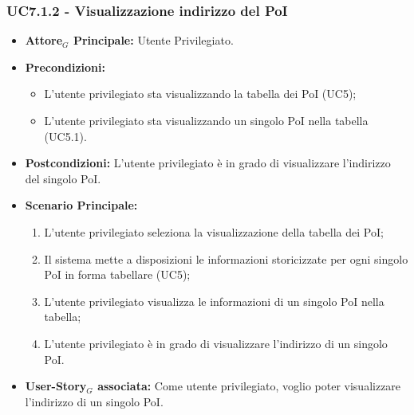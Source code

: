 \documentclass[11pt]{article}
\begin{document}
\begin{justify}
\subsubsection{\textbf{UC7.1.2 - Visualizzazione indirizzo del PoI}}
\label{UC7.1.2}
\begin{itemize}
    \item \textbf{Attore$_G$ Principale:} Utente Privilegiato.
    \item \textbf{Precondizioni:} 
        \begin{itemize}
          \item L'utente privilegiato sta visualizzando la tabella dei PoI (UC5);
            \item L'utente privilegiato sta visualizzando un singolo PoI nella tabella (UC5.1).
        \end{itemize}
      \item \textbf{Postcondizioni:} L'utente privilegiato è in grado di visualizzare l'indirizzo del singolo PoI.\\
    \item \textbf{Scenario Principale:} 
        \begin{enumerate}
        \item L'utente privilegiato seleziona la visualizzazione della tabella dei PoI;
          \item Il sistema mette a disposizioni le informazioni storicizzate per ogni singolo PoI in forma tabellare (UC5);
          \item L'utente privilegiato visualizza le informazioni di un singolo PoI nella tabella;
            \item L'utente privilegiato è in grado di visualizzare l'indirizzo di un singolo PoI.
        \end{enumerate}
    \item \textbf{User-Story$_G$ associata:} Come utente privilegiato, voglio poter visualizzare l'indirizzo di un singolo PoI.
\end{itemize}

\end{justify}
\end{document}
